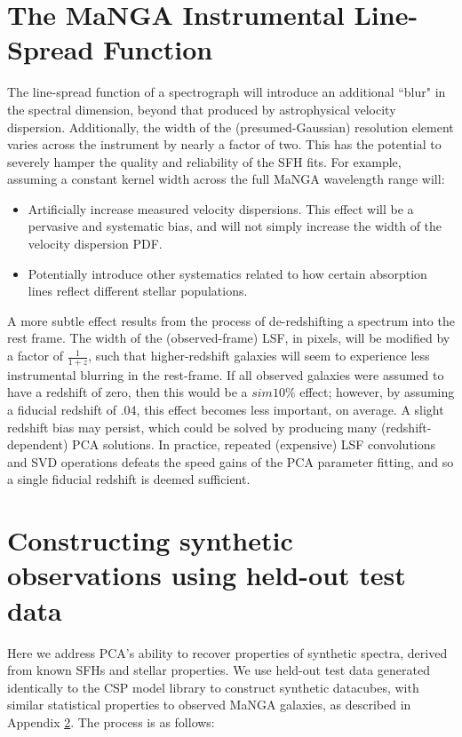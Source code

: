 \chapappendix

\section{The MaNGA Instrumental Line-Spread Function}
\label{chap1:apdx:lsf}

The line-spread function of a spectrograph will introduce an additional ``blur" in the spectral dimension, beyond that produced by astrophysical velocity dispersion. Additionally, the width of the (presumed-Gaussian) resolution element varies across the instrument by nearly a factor of two. This has the potential to severely hamper the quality and reliability of the SFH fits. For example, assuming a constant kernel width across the full MaNGA wavelength range will:

\begin{itemize}
    \item Artificially increase measured velocity dispersions. This effect will be a pervasive and systematic bias, and will not simply increase the width of the velocity dispersion PDF.
    \item Potentially introduce other systematics related to how certain absorption lines reflect different stellar populations.
\end{itemize}

A more subtle effect results from the process of de-redshifting a spectrum into the rest frame. The width of the (observed-frame) LSF, in pixels, will be modified by a factor of $\frac{1}{1 + z}$, such that higher-redshift galaxies will seem to experience less instrumental blurring in the rest-frame. If all observed galaxies were assumed to have a redshift of zero, then this would be a $sim 10\%$ effect; however, by assuming a fiducial redshift of .04, this effect becomes less important, on average. A slight redshift bias may persist, which could be solved by producing many (redshift-dependent) PCA solutions. In practice, repeated (expensive) LSF convolutions and SVD operations defeats the speed gains of the PCA parameter fitting, and so a single fiducial redshift is deemed sufficient.

\section{Constructing synthetic observations using held-out test data}
\label{chap1:apdx:fakedata}

Here we address PCA's ability to recover properties of synthetic spectra, derived from known SFHs and stellar properties. We use held-out test data generated identically to the CSP model library to construct synthetic datacubes, with similar statistical properties to observed MaNGA galaxies, as described in Appendix \ref{chap1:apdx:fakedata}. The process is as follows:

